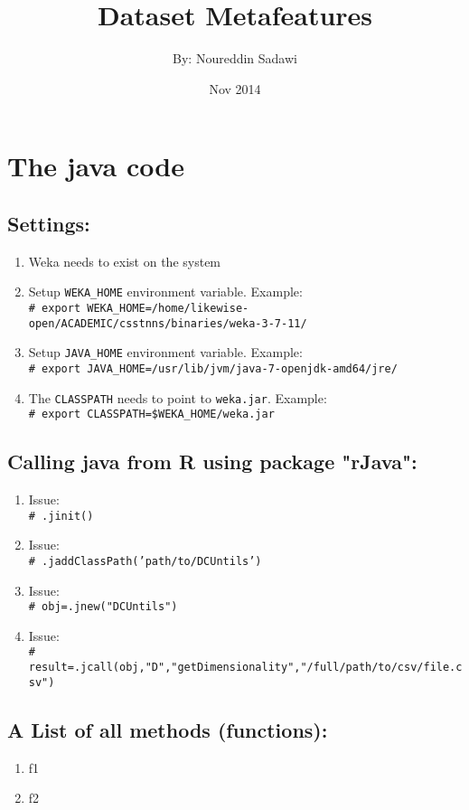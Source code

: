 \documentclass[a4paper,12pt, english]{article}
\newcommand{\shellcmd}[1]{\\\indent\indent\texttt{\footnotesize\# #1}\\}
\begin{document}
\title{Dataset Metafeatures}
\date{Nov 2014}
\author{By: Noureddin Sadawi}
\maketitle

\large
\section{The java code}
\subsection{Settings:}
\begin{enumerate}
	\item Weka needs to exist on the system
	\item Setup \texttt{WEKA\_HOME} environment variable. Example:
   	  \shellcmd{export WEKA\_HOME=/home/likewise-open/ACADEMIC/csstnns/binaries/weka-3-7-11/}

	\item Setup \texttt{JAVA\_HOME} environment variable. Example: 
	\shellcmd{export JAVA\_HOME=/usr/lib/jvm/java-7-openjdk-amd64/jre/}
	\item The \texttt{CLASSPATH} needs to point to \texttt{weka.jar}. Example:
	\shellcmd{export CLASSPATH=\$WEKA\_HOME/weka.jar}
\end{enumerate} 

\subsection{Calling java from R using package "rJava":}
\begin{enumerate}
	\item Issue:\shellcmd{.jinit()}
	\item Issue:\shellcmd{.jaddClassPath('path/to/DCUntils')}
	\item Issue:\shellcmd{obj=.jnew("DCUntils")}
	\item Issue:\shellcmd{result=.jcall(obj,"D","getDimensionality","/full/path/to/csv/file.csv")}
\end{enumerate} 


\subsection{A List of all methods (functions):}
\begin{enumerate}
	\item f1
	\item f2
\end{enumerate}    
\end{document}
